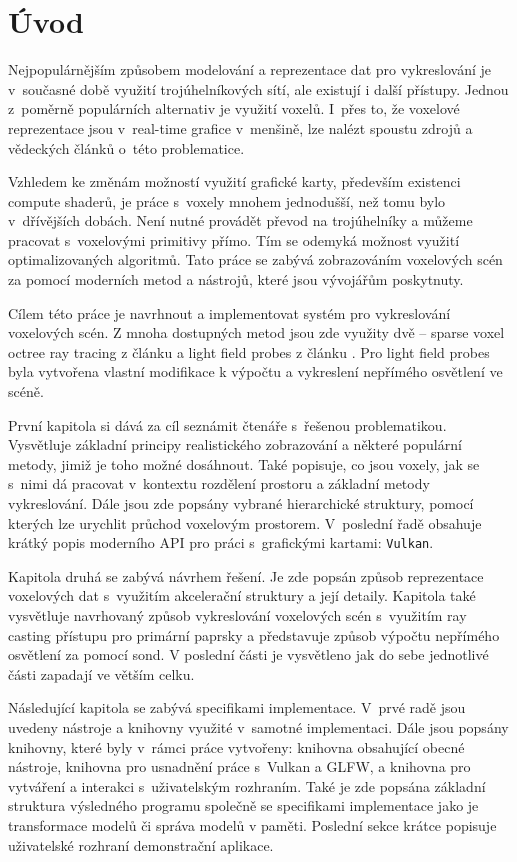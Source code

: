 \chapter{Úvod}
\label{uvod}
Nejpopulárnějším způsobem modelování a reprezentace dat pro vykreslování je v~současné době využití trojúhelníkových sítí, ale existují i další přístupy. Jednou z~poměrně populárních alternativ je využití voxelů. I~přes to, že voxelové reprezentace jsou v~real-time grafice v~menšině, lze nalézt spoustu zdrojů a vědeckých článků o~této problematice.

Vzhledem ke změnám možností využití grafické karty, především existenci compute shaderů, je práce s~voxely mnohem jednodušší, než tomu bylo v~dřívějších dobách. Není nutné provádět převod na trojúhelníky a můžeme pracovat s~voxelovými primitivy přímo. Tím se odemyká možnost využití optimalizovaných algoritmů. Tato práce se zabývá zobrazováním voxelových scén za pomocí moderních metod a nástrojů, které jsou vývojářům poskytnuty.

Cílem této práce je navrhnout a implementovat systém pro vykreslování voxelových scén. Z mnoha dostupných metod jsou zde využity dvě -- sparse voxel octree ray tracing z článku \cite{Laine2011EfficientSV} a light field probes z článku \cite{light_field_probes}. Pro light field probes byla vytvořena vlastní modifikace k výpočtu a vykreslení nepřímého osvětlení ve scéně.

První kapitola si dává za cíl seznámit čtenáře s~řešenou problematikou. Vysvětluje základní principy realistického zobrazování a některé populární metody, jimiž je toho možné dosáhnout. Také popisuje, co jsou voxely, jak se s~nimi dá pracovat v~kontextu rozdělení prostoru a základní metody vykreslování. Dále jsou zde popsány vybrané hierarchické struktury, pomocí kterých lze urychlit průchod voxelovým prostorem. V~poslední řadě obsahuje krátký popis moderního API pro práci s~grafickými kartami: \texttt{Vulkan}.

Kapitola druhá se zabývá návrhem řešení. Je zde popsán způsob reprezentace voxelových dat s~využitím akcelerační struktury a její detaily. Kapitola také vysvětluje navrhovaný způsob vykreslování voxelových scén s~využitím ray casting přístupu pro primární paprsky a představuje způsob výpočtu nepřímého osvětlení za pomocí sond. V poslední části je vysvětleno jak do sebe jednotlivé části zapadají ve větším celku.

Následující kapitola se zabývá specifikami implementace. V~prvé radě jsou uvedeny nástroje a knihovny využité v~samotné implementaci. Dále jsou popsány knihovny, které byly v~rámci práce vytvořeny: knihovna obsahující obecné nástroje, knihovna pro usnadnění práce s~Vulkan a GLFW, a knihovna pro vytváření a interakci s~uživatelským rozhraním. Také je zde popsána základní struktura výsledného programu společně se specifikami implementace jako je transformace modelů či správa modelů v paměti. Poslední sekce krátce popisuje uživatelské rozhraní demonstrační aplikace.

